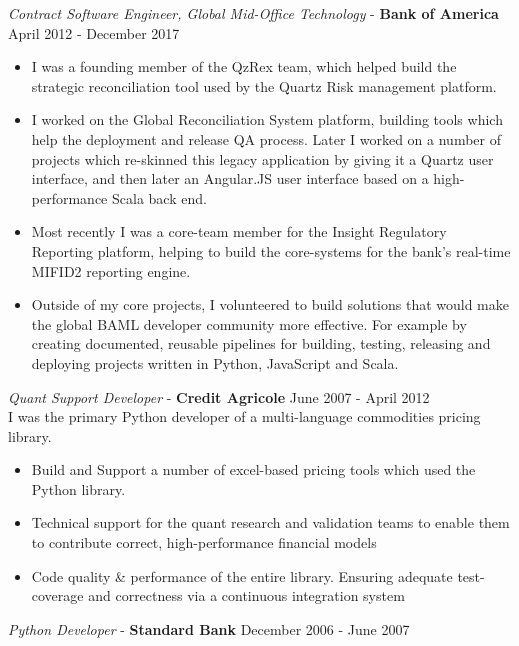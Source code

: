 \documentclass[margin, 10pt]{res} %
\begin{document}
\begin{resume}
        {\sl Contract Software Engineer, Global Mid-Office Technology} - \textbf{Bank of America} \hfill April 2012 - December 2017 \\

        \begin{itemize}
            \item I was a founding member of the QzRex team, which helped build the strategic reconciliation tool used by the Quartz Risk management platform.
            \item I worked on the Global Reconciliation System platform, building tools which help the deployment and release QA process. Later I worked on a number of projects which re-skinned this legacy application by giving it a Quartz user interface, and then later an Angular.JS user interface based on a high-performance Scala back end.
            \item Most recently I was a core-team member for the Insight Regulatory Reporting platform, helping to build the core-systems for the bank's real-time MIFID2 reporting engine.
            \item Outside of my core projects, I volunteered to build solutions that would make the global BAML developer community more effective. For example by creating documented, reusable pipelines for building, testing, releasing and deploying projects written in Python, JavaScript and Scala.
        \end{itemize}

        {\sl Quant Support Developer} - \textbf{Credit Agricole} \hfill June 2007 - April 2012 \\

        I was the primary Python developer of a multi-language commodities pricing library.

        \begin{itemize}
            \item Build and Support a number of excel-based pricing tools which used the Python library.
            \item Technical support for the quant research and validation teams to enable them to contribute correct, high-performance financial models
            \item Code quality \& performance of the entire library. Ensuring adequate test-coverage and correctness via a continuous integration system
        \end{itemize}

        {\sl Python Developer} - \textbf{Standard Bank} \hfill December 2006 - June 2007\\


\end{resume}
\end{document}
